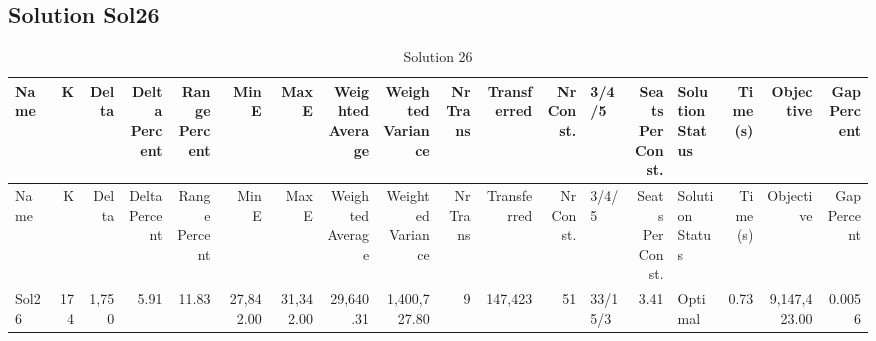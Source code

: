 \documentclass[a4paper]{article}
\begin{document}
\clearpage
\subsection{Solution Sol26}

{\scriptsize
\begin{longtable}{lrrrrrrrrrrrlrlrrr}
\caption{Solution 26}
\\ \toprule
Name &K &Delta &\shortstack{Delta\\Percent} &\shortstack{Range\\Percent} &Min E &Max E &\shortstack{Weighted\\Average} &\shortstack{Weighted\\Variance} &\shortstack{Nr\\Trans} &Transferred &\shortstack{Nr\\Const.} &3/4/5 &\shortstack{Seats\\Per\\Const.} &\shortstack{Solution\\Status} &\shortstack{Time\\(s)} &Objective &\shortstack{Gap\\Percent} \\ \midrule
\endfirsthead
\toprule
Name &K &Delta &\shortstack{Delta\\Percent} &\shortstack{Range\\Percent} &Min E &Max E &\shortstack{Weighted\\Average} &\shortstack{Weighted\\Variance} &\shortstack{Nr\\Trans} &Transferred &\shortstack{Nr\\Const.} &3/4/5 &\shortstack{Seats\\Per\\Const.} &\shortstack{Solution\\Status} &\shortstack{Time\\(s)} &Objective &\shortstack{Gap\\Percent} \\ \midrule
\endhead
\bottomrule
\endfoot
Sol26&174&1,750& 5.91&11.83&27,842.00&31,342.00&29,640.31&1,400,727.80&9&147,423&51&33/15/3& 3.41&Optimal& 0.73&9,147,423.00&0.0056\\ 
\end{longtable}

}
\end{document}

